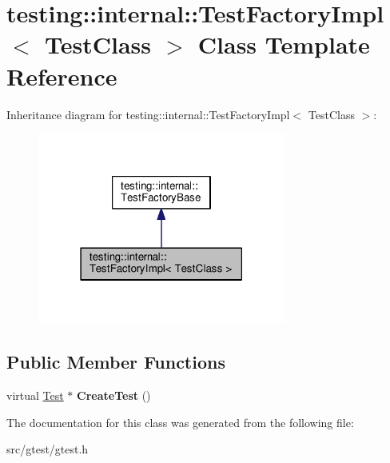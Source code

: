 \hypertarget{classtesting_1_1internal_1_1_test_factory_impl}{}\section{testing\+:\+:internal\+:\+:Test\+Factory\+Impl$<$ Test\+Class $>$ Class Template Reference}
\label{classtesting_1_1internal_1_1_test_factory_impl}


Inheritance diagram for testing\+:\+:internal\+:\+:Test\+Factory\+Impl$<$ Test\+Class $>$\+:
\nopagebreak
\begin{figure}[H]
\begin{center}
\leavevmode
\includegraphics[width=231pt]{classtesting_1_1internal_1_1_test_factory_impl__inherit__graph}
\end{center}
\end{figure}
\subsection*{Public Member Functions}
\begin{DoxyCompactItemize}
\item 
\mbox{\label{classtesting_1_1internal_1_1_test_factory_impl_a8860c89bdb06450a5d5e8137ebd9d775}} 
virtual \mbox{\hyperlink{classtesting_1_1_test}{Test}} $\ast$ {\bfseries Create\+Test} ()
\end{DoxyCompactItemize}


The documentation for this class was generated from the following file\+:\begin{DoxyCompactItemize}
\item 
src/gtest/gtest.\+h\end{DoxyCompactItemize}

